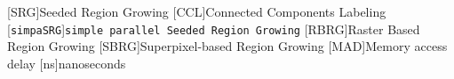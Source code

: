 \begin{acronym}
  [SRG]{Seeded Region Growing}
  [CCL]{Connected Components Labeling}
  [\texttt{simpaSRG}]{\texttt{simple parallel Seeded Region Growing}}
  [RBRG]{Raster Based Region Growing}
  [SBRG]{Superpixel-based Region Growing}
  [MAD]{Memory access delay}
  [ns]{nanoseconds}
\end{acronym}

